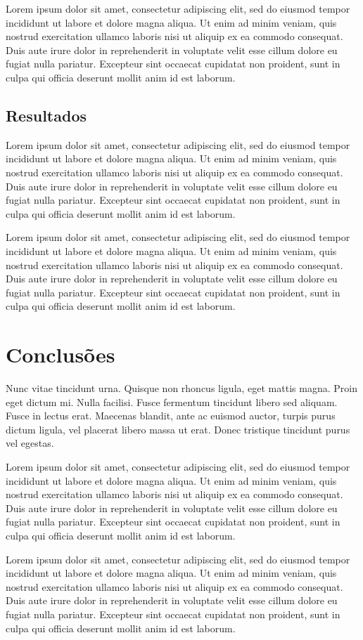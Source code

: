 	Lorem ipsum dolor sit amet, consectetur adipiscing elit, sed do eiusmod tempor incididunt ut labore et dolore magna aliqua. Ut enim ad minim veniam, quis nostrud exercitation ullamco laboris nisi ut aliquip ex ea commodo consequat. Duis aute irure dolor in reprehenderit in voluptate velit esse cillum dolore eu fugiat nulla pariatur. Excepteur sint occaecat cupidatat non proident, sunt in culpa qui officia deserunt mollit anim id est laborum.
	
	\subsection{Resultados}
	Lorem ipsum dolor sit amet, consectetur adipiscing elit, sed do eiusmod tempor incididunt ut labore et dolore magna aliqua. Ut enim ad minim veniam, quis nostrud exercitation ullamco laboris nisi ut aliquip ex ea commodo consequat. Duis aute irure dolor in reprehenderit in voluptate velit esse cillum dolore eu fugiat nulla pariatur. Excepteur sint occaecat cupidatat non proident, sunt in culpa qui officia deserunt mollit anim id est laborum.
	
	Lorem ipsum dolor sit amet, consectetur adipiscing elit, sed do eiusmod tempor incididunt ut labore et dolore magna aliqua. Ut enim ad minim veniam, quis nostrud exercitation ullamco laboris nisi ut aliquip ex ea commodo consequat. Duis aute irure dolor in reprehenderit in voluptate velit esse cillum dolore eu fugiat nulla pariatur. Excepteur sint occaecat cupidatat non proident, sunt in culpa qui officia deserunt mollit anim id est laborum.

\newpage

\section{Conclusões}\label{sec:LABEL_CHP_1_SEC_J}
Nunc vitae tincidunt urna. Quisque non rhoncus ligula, eget mattis magna. Proin eget dictum mi. Nulla facilisi. Fusce fermentum tincidunt libero sed aliquam. Fusce in lectus erat. Maecenas blandit, ante ac euismod auctor, turpis purus dictum ligula, vel placerat libero massa ut erat. Donec tristique tincidunt purus vel egestas.

Lorem ipsum dolor sit amet, consectetur adipiscing elit, sed do eiusmod tempor incididunt ut labore et dolore magna aliqua. Ut enim ad minim veniam, quis nostrud exercitation ullamco laboris nisi ut aliquip ex ea commodo consequat. Duis aute irure dolor in reprehenderit in voluptate velit esse cillum dolore eu fugiat nulla pariatur. Excepteur sint occaecat cupidatat non proident, sunt in culpa qui officia deserunt mollit anim id est laborum.

Lorem ipsum dolor sit amet, consectetur adipiscing elit, sed do eiusmod tempor incididunt ut labore et dolore magna aliqua. Ut enim ad minim veniam, quis nostrud exercitation ullamco laboris nisi ut aliquip ex ea commodo consequat. Duis aute irure dolor in reprehenderit in voluptate velit esse cillum dolore eu fugiat nulla pariatur. Excepteur sint occaecat cupidatat non proident, sunt in culpa qui officia deserunt mollit anim id est laborum.